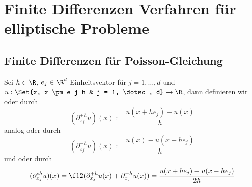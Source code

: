 \chapter{Finite Differenzen Verfahren für elliptische Probleme} \label{chap:2}



\section{Finite Differenzen für Poisson-Gleichung}


\begin{df} \label{2.1}
	Sei $h \in \R$, $e_j \in \R^d$ Einheitsvektor für $j = 1, \dotsc, d$ und $u: \Set{x, x \pm e_j h & j = 1, \dotsc, d} \to \R$, dann definieren wir  oder  durch
	\[
		(\partial_{x_j}^{+h}u)(x) := \frac{u(x+he_j) -u(x)}{h}
	\]
	analog  oder  durch
	\[
		(\partial_{x_j}^{-h}u)(x) := \frac{u(x) - u(x-he_j)}{h}
	\]
	und  oder  durch
	\[
		(\partial_{x_j}^{ch} u)(x)
		= \f 12 (\partial_{x_j}^{+h} u(x) + \partial_{x_j}^{-h} u(x))
		= \frac{u(x+he_j) - u(x-he_j)}{2h}
	\]
\end{df}


